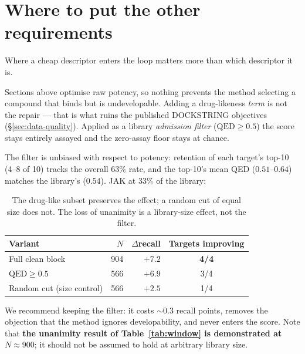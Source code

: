 \documentclass[11pt]{article}
\begin{document}
\section{Where to put the other requirements}

Where a cheap descriptor enters the loop matters more than which descriptor it
is.

\label{sec:filter}

Sections above optimise raw potency, so nothing prevents the method selecting a
compound that binds but is undevelopable. Adding a drug-likeness \emph{term} is
not the repair --- that is what ruins the published DOCKSTRING objectives
(\S\ref{sec:data-quality}). Applied as a library \emph{admission filter}
($\mathrm{QED} \ge 0.5$) the score stays entirely assayed and the zero-assay
floor stays at chance.

The filter is unbiased with respect to potency: retention of each target's
top-10 (4--8 of 10) tracks the overall $63\%$ rate, and the top-10's mean QED
($0.51$--$0.64$) matches the library's ($0.54$). JAK at $33\%$ of the library:

\begin{table}[ht]
\centering\small
\begin{tabular}{lrrc}
\toprule
Variant & $N$ & $\Delta$recall & Targets improving \\
\midrule
Full clean block           & 904 & $+7.2$ & \textbf{4/4} \\
$\mathrm{QED} \ge 0.5$     & 566 & $+6.9$ & 3/4 \\
Random cut (size control)  & 566 & $+2.5$ & 1/4 \\
\bottomrule
\end{tabular}
\caption{The drug-like subset preserves the effect; a random cut of equal size
does not. The loss of unanimity is a library-size effect, not the filter.}
\label{tab:qed}
\end{table}

We recommend keeping the filter: it costs ${\sim}0.3$ recall points, removes the
objection that the method ignores developability, and never enters the score.
Note that \textbf{the unanimity result of Table~\ref{tab:window} is demonstrated
at $N \approx 900$}; it should not be assumed to hold at arbitrary library size.
\end{document}
